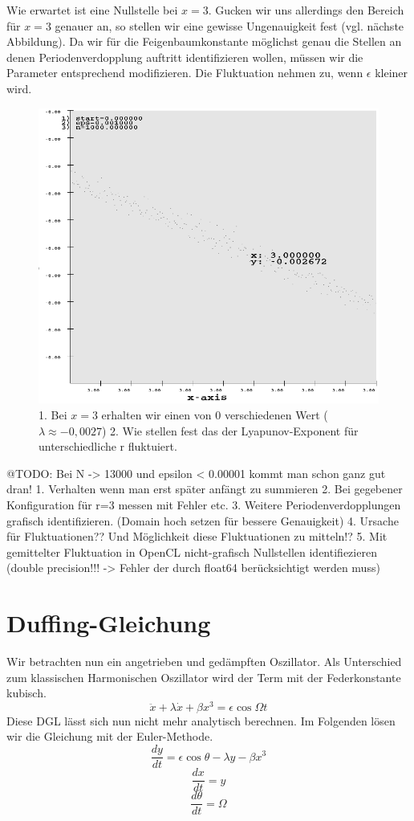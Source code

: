 \documentclass{scrartcl}
\begin{document}
Wie erwartet ist eine Nullstelle bei $x=3$. Gucken wir uns allerdings den Bereich für $x=3$ genauer an, so stellen wir eine gewisse Ungenauigkeit fest (vgl. nächste Abbildung). Da wir für die Feigenbaumkonstante möglichst genau die Stellen an denen Periodenverdopplung auftritt identifizieren wollen, müssen wir die Parameter entsprechend modifizieren. Die Fluktuation nehmen zu, wenn $\epsilon$ kleiner wird.
\begin{figure}
	\centering
	\includegraphics[scale=0.50]{lyapunov_1000_at_3}
	\caption{1. Bei $x=3$ erhalten wir einen von 0 verschiedenen Wert ($\lambda\approx-0,0027$) 2. Wie stellen fest das der Lyapunov-Exponent für unterschiedliche r fluktuiert.}
	\label{img:lyapunov_1000_at_3}
\end{figure}
\newline
@TODO: Bei N -> 13000 und epsilon < 0.00001 kommt man schon ganz gut dran!
1. Verhalten wenn man erst später anfängt zu summieren
2. Bei gegebener Konfiguration für r=3 messen mit Fehler etc.
3. Weitere Periodenverdopplungen grafisch identifizieren. (Domain hoch setzen für bessere Genauigkeit)
4. Ursache für Fluktuationen?? Und Möglichkeit diese Fluktuationen zu mitteln!?
5. Mit gemittelter Fluktuation in OpenCL nicht-grafisch Nullstellen identifiezieren (double precision!!! -> Fehler der durch float64 berücksichtigt werden muss)

\section { Duffing-Gleichung}
Wir betrachten nun ein angetrieben und gedämpften Oszillator. Als Unterschied zum klassischen Harmonischen Oszillator wird der Term mit der Federkonstante kubisch.
$$\ddot{x}+\lambda\dot{x}+\beta x^3=\epsilon\cos{\Omega t}$$
Diese DGL lässt sich nun nicht mehr analytisch berechnen.
Im Folgenden lösen wir die Gleichung mit der Euler-Methode.
$$\frac{dy}{dt}=\epsilon\cos{\theta}-\lambda y - \beta x^3$$
$$\frac{dx}{dt}=y$$
$$\frac{d\theta}{dt}=\Omega$$
\end{document}

